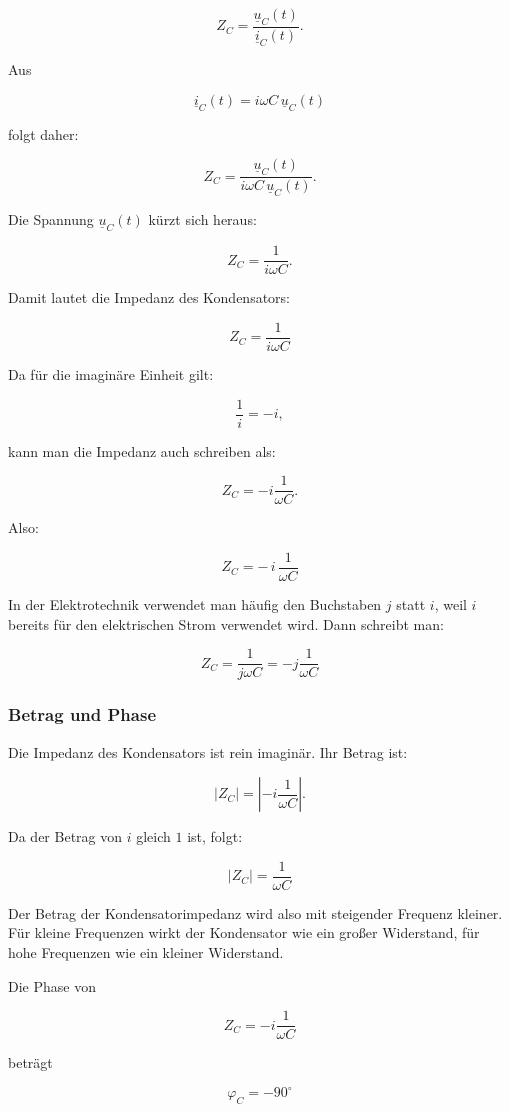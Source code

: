 \[
Z_C=\frac{\underline{u}_C(t)}{\underline{i}_C(t)}.
\]

Aus

\[
\underline{i}_C(t)
=
i\omega C\,\underline{u}_C(t)
\]

folgt daher:

\[
Z_C
=
\frac{\underline{u}_C(t)}
{i\omega C\,\underline{u}_C(t)}.
\]

Die Spannung $\underline{u}_C(t)$ kürzt sich heraus:

\[
Z_C
=
\frac{1}{i\omega C}.
\]

Damit lautet die Impedanz des Kondensators:

\[
\boxed{
	Z_C=\frac{1}{i\omega C}
}
\]

Da für die imaginäre Einheit gilt:

\[
\frac{1}{i}=-i,
\]

kann man die Impedanz auch schreiben als:

\[
Z_C
=
-i\frac{1}{\omega C}.
\]

Also:

\[
\boxed{
	Z_C=-\,i\,\frac{1}{\omega C}
}
\]

In der Elektrotechnik verwendet man häufig den Buchstaben $j$ statt $i$, weil
$i$ bereits für den elektrischen Strom verwendet wird. Dann schreibt man:

\[
\boxed{
	Z_C=\frac{1}{j\omega C}
	=
	-j\frac{1}{\omega C}
}
\]

\subsubsection{Betrag und Phase}
\label{subsubsec:betrag-und-phase-kondensatorimpedanz}

Die Impedanz des Kondensators ist rein imaginär. Ihr Betrag ist:

\[
\left|Z_C\right|
=
\left|-i\frac{1}{\omega C}\right|.
\]

Da der Betrag von $i$ gleich $1$ ist, folgt:

\[
\boxed{
	\left|Z_C\right|=\frac{1}{\omega C}
}
\]

Der Betrag der Kondensatorimpedanz wird also mit steigender Frequenz kleiner.
Für kleine Frequenzen wirkt der Kondensator wie ein großer Widerstand, für hohe
Frequenzen wie ein kleiner Widerstand.

Die Phase von

\[
Z_C=-i\frac{1}{\omega C}
\]

beträgt

\[
\boxed{
	\varphi_C=-90^\circ
}
\]

